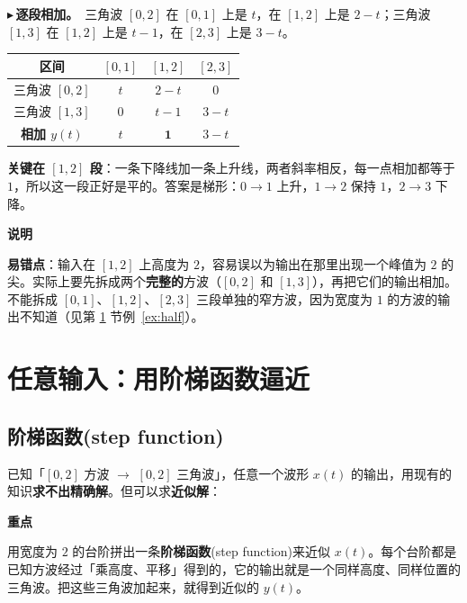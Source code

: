 \documentclass[UTF8,a4paper,11pt]{ctexart}
\newenvironment{remember}{\begin{rememberbox}\textbf{重点}\par\smallskip}{\end{rememberbox}}
\newenvironment{note}{\begin{notebox}\textbf{说明}\par\smallskip}{\end{notebox}}
\newcounter{ex}[section]
\newcommand{\point}[1]{\par\addvspace{1ex}\noindent\textcolor{ptteal}{$\blacktriangleright$\,\textbf{#1}}\ }
\begin{document}
\point{逐段相加。}三角波 $[0,2]$ 在 $[0,1]$ 上是 $t$，在 $[1,2]$ 上是 $2-t$；三角波 $[1,3]$ 在 $[1,2]$ 上是 $t-1$，在 $[2,3]$ 上是 $3-t$。

\begin{center}
\begin{tabular}{@{}c|ccc@{}}
\toprule
区间 & $[0,1]$ & $[1,2]$ & $[2,3]$\\
\midrule
三角波 $[0,2]$ & $t$ & $2-t$ & $0$\\
三角波 $[1,3]$ & $0$ & $t-1$ & $3-t$\\
\midrule
\textbf{相加 $y(t)$} & $t$ & $\mathbf{1}$ & $3-t$\\
\bottomrule
\end{tabular}
\end{center}

\textbf{关键在 $[1,2]$ 段}：一条下降线加一条上升线，两者斜率相反，每一点相加都等于 $1$，所以这一段正好是平的。答案是梯形：$0\to1$ 上升，$1\to2$ 保持 $1$，$2\to3$ 下降。

\begin{note}
\textbf{易错点}：输入在 $[1,2]$ 上高度为 $2$，容易误以为输出在那里出现一个峰值为 $2$ 的尖。实际上要先拆成两个\textbf{完整的}方波（$[0,2]$ 和 $[1,3]$），再把它们的输出相加。不能拆成 $[0,1]$、$[1,2]$、$[2,3]$ 三段单独的窄方波，因为宽度为 $1$ 的方波的输出不知道（见第 \ref{sec:step} 节例~\ref{ex:half}）。
\end{note}

\section{任意输入：用阶梯函数逼近}\label{sec:step}
\subsection{阶梯函数(step function)}
已知「$[0,2]$ 方波 $\to$ $[0,2]$ 三角波」，任意一个波形 $x(t)$ 的输出，用现有的知识\textbf{求不出精确解}。但可以求\textbf{近似解}：

\begin{remember}
用宽度为 $2$ 的台阶拼出一条\textbf{阶梯函数}(step function)来近似 $x(t)$。每个台阶都是已知方波经过「乘高度、平移」得到的，它的输出就是一个同样高度、同样位置的三角波。把这些三角波加起来，就得到近似的 $y(t)$。
\end{remember}
\end{document}
